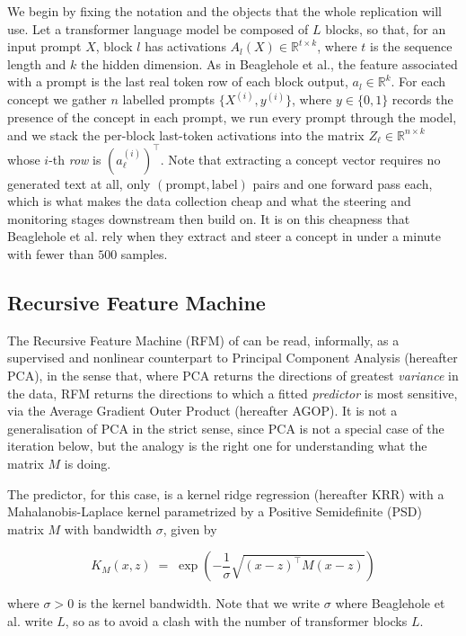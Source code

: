 We begin by fixing the notation and the objects that the whole replication will use. Let
a transformer language model be composed of $L$ blocks, so that, for an input prompt $X$,
block $l$ has activations $A_l(X) \in \mathbb{R}^{t \times k }$, where $t$ is the sequence
length and $k$ the hidden dimension. As in Beaglehole et al., the feature associated with
a prompt is the last real token row of each block output, $a_l \in \mathbb{R}^k$. For each
concept we gather $n$ labelled prompts $\{X^{(i)}, y^{(i)}\}$, where $y \in \{0,1\}$
records the presence of the concept in each prompt, we run every prompt through the model,
and we stack the per-block last-token activations into the matrix
$Z_\ell \in \mathbb{R}^{n \times k}$ whose $i$-th \emph{row} is
$\left(a_\ell^{(i)}\right)^{\top}$. Note that extracting a concept vector requires no
generated text at all, only $(\text{prompt}, \text{label})$ pairs and one forward pass
each, which is what makes the data collection cheap and what the steering and monitoring
stages downstream then build on. It is on this cheapness that Beaglehole et al. rely when
they extract and steer a concept in under a minute with fewer than $500$ samples.

\subsection{Recursive Feature Machine}

The Recursive Feature Machine (RFM) of \cite{radhakrishnan2024mechanism} can be read,
informally, as a supervised and nonlinear counterpart to Principal Component Analysis
(hereafter PCA), in the sense that, where PCA returns the directions of greatest
\emph{variance} in the data, RFM returns the directions to which a fitted \emph{predictor}
is most sensitive, via the Average Gradient Outer Product (hereafter AGOP). It is not a
generalisation of PCA in the strict sense, since PCA is not a special case of the
iteration below, but the analogy is the right one for understanding what the matrix $M$ is
doing.

The predictor, for this case, is a kernel ridge regression (hereafter KRR) with a
Mahalanobis-Laplace kernel parametrized by a Positive Semidefinite (PSD) matrix $M$ with
bandwidth $\sigma$, given by

\[
  K_M(x,z) \;=\; \exp\!\left(-\frac{1}{\sigma}\sqrt{(x-z)^{\top} M (x-z)}\right)
\]

where $\sigma>0$ is the kernel bandwidth. Note that we write $\sigma$ where Beaglehole et
al. write $L$, so as to avoid a clash with the number of transformer blocks $L$.

